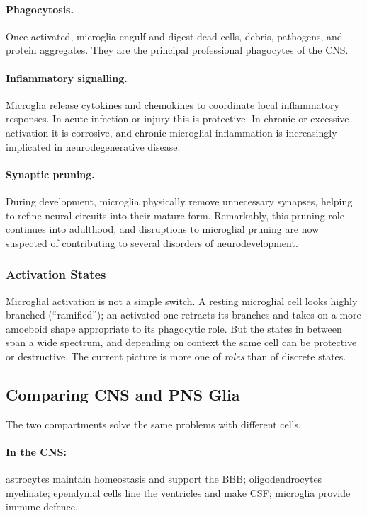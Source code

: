 \documentclass[11pt]{article}
\begin{document}
\paragraph{Phagocytosis.} Once activated, microglia engulf and digest dead cells, debris, pathogens, and protein aggregates. They are the principal professional phagocytes of the CNS.

\paragraph{Inflammatory signalling.} Microglia release cytokines and chemokines to coordinate local inflammatory responses. In acute infection or injury this is protective. In chronic or excessive activation it is corrosive, and chronic microglial inflammation is increasingly implicated in neurodegenerative disease.

\paragraph{Synaptic pruning.} During development, microglia physically remove unnecessary synapses, helping to refine neural circuits into their mature form. Remarkably, this pruning role continues into adulthood, and disruptions to microglial pruning are now suspected of contributing to several disorders of neurodevelopment.

\subsubsection{Activation States}

Microglial activation is not a simple switch. A resting microglial cell looks highly branched (``ramified''); an activated one retracts its branches and takes on a more amoeboid shape appropriate to its phagocytic role. But the states in between span a wide spectrum, and depending on context the same cell can be protective or destructive. The current picture is more one of \textit{roles} than of discrete states.

\subsection{Comparing CNS and PNS Glia}

The two compartments solve the same problems with different cells.

\paragraph{In the CNS:} astrocytes maintain homeostasis and support the BBB; oligodendrocytes myelinate; ependymal cells line the ventricles and make CSF; microglia provide immune defence.
\end{document}
